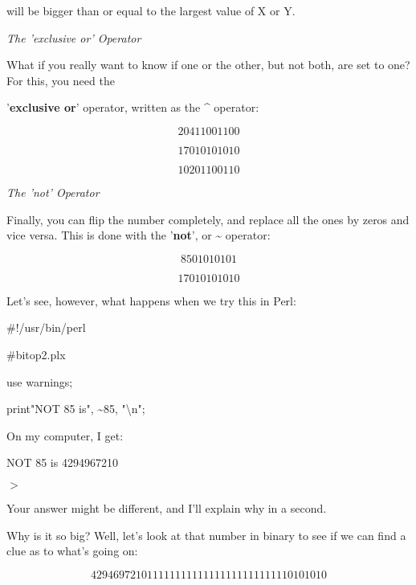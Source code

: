 \documentclass[a4paper,11pt]{book}
\begin{document}
\noindent will be bigger than or equal to the largest value of X or Y.

\noindent 

\noindent \textit{The 'exclusive or' Operator}

\noindent What if you really want to know if one or the other, but not both, are set to one? For this, you need the

\noindent '\textbf{exclusive or}' operator, written as the \^{} operator:

\noindent 

\[204   11001100\] 

\[170   10101010\] 

\[102   01100110\] 


\noindent \textit{The 'not' Operator}

\noindent Finally, you can flip the number completely, and replace all the ones by zeros and vice versa. This is done with the '\textbf{not}', or \~{} operator:

\noindent 

\[85     01010101\] 

\[170   10101010\] 


\noindent Let's see, however, what happens when we try this in Perl:

\noindent 

\noindent 

\noindent \#!/usr/bin/perl

\noindent \#bitop2.plx

\noindent use warnings;

\noindent print"NOT 85 is", \~{}85, "\textbackslash n";

\noindent 

\noindent On my computer, I get:

\noindent 

\noindent NOT 85 is 4294967210

\noindent $>$

\noindent 

\noindent 

\noindent Your answer might be different, and I'll explain why in a second.

\noindent 

\noindent Why is  it so  big? Well,  let's  look  at  that  number  in  binary  to  see if  we  can find  a  clue  as to what's going on:

\noindent 

\[4294697210    11111111111111111111111110101010\] 
\end{document}
